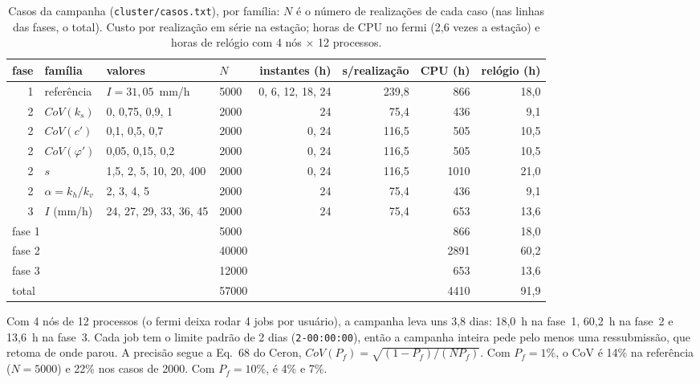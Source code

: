 \documentclass[11pt,a4paper]{article}
\begin{document}
\begin{table}[htbp]\centering\footnotesize\setlength{\tabcolsep}{4pt}
\caption{Casos da campanha (\texttt{cluster/casos.txt}), por família: $N$ é o número de realizações de cada caso (nas
linhas das fases, o total). Custo por realização em série na estação; horas de CPU no fermi (2,6 vezes a estação) e
horas de relógio com 4 nós $\times$ 12 processos.}\label{tab:casos}
\begin{tabular}{rlllrrrr}\toprule
fase & família & valores & $N$ & instantes (h) & s/realização & CPU (h) & relógio (h) \\\midrule
1 & referência & $I = 31{,}05$~mm/h & 5000 & 0, 6, 12, 18, 24 & 239,8 & 866 & 18,0 \\
2 & $CoV(k_s)$ & 0, 0{,}75, 0{,}9, 1 & 2000 & 24 & 75,4 & 436 & 9,1 \\
2 & $CoV(c')$ & 0{,}1, 0{,}5, 0{,}7 & 2000 & 0, 24 & 116,5 & 505 & 10,5 \\
2 & $CoV(\varphi')$ & 0{,}05, 0{,}15, 0{,}2 & 2000 & 0, 24 & 116,5 & 505 & 10,5 \\
2 & $s$ & 1{,}5, 2, 5, 10, 20, 400 & 2000 & 0, 24 & 116,5 & 1010 & 21,0 \\
2 & $\alpha = k_h/k_v$ & 2, 3, 4, 5 & 2000 & 24 & 75,4 & 436 & 9,1 \\
3 & $I$ (mm/h) & 24, 27, 29, 33, 36, 45 & 2000 & 24 & 75,4 & 653 & 13,6 \\
\midrule
\multicolumn{3}{l}{fase 1} & 5000 & & & 866 & 18,0 \\
\multicolumn{3}{l}{fase 2} & 40000 & & & 2891 & 60,2 \\
\multicolumn{3}{l}{fase 3} & 12000 & & & 653 & 13,6 \\
\multicolumn{3}{l}{total} & 57000 & & & 4410 & 91,9 \\
\bottomrule\end{tabular}\end{table}

Com 4 nós de 12 processos (o fermi deixa rodar 4 jobs por usuário), a campanha leva uns 3,8 dias: 18,0~h na fase~1,
60,2~h na fase~2 e 13,6~h na fase~3. Cada job tem o limite padrão de 2 dias (\texttt{2-00:00:00}), então a campanha
inteira pede pelo menos uma ressubmissão, que retoma de onde parou. A precisão segue a Eq.~68 do Ceron,
$CoV(P_f) = \sqrt{(1 - P_f)/(N P_f)}$. Com $P_f = 1\%$, o CoV é 14\% na referência ($N = 5000$) e 22\% nos casos de 2000.
Com $P_f = 10\%$, é 4\% e 7\%.
\end{document}

